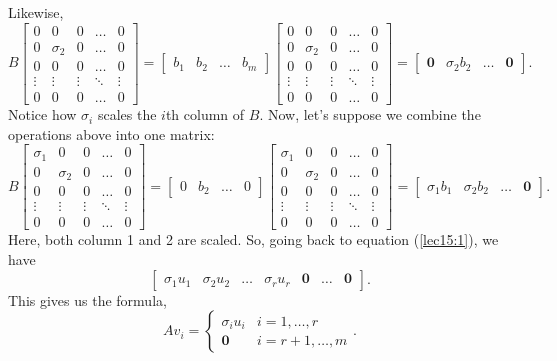 \documentclass[letterpaper]{article}
\newcommand{\0}{\mathbf{0}}
\begin{document}
Likewise, \[B \begin{bmatrix}
    0 & 0 & 0 & \hdots & 0 \\ 
    0 & \sigma_2 & 0 & \hdots & 0 \\ 
    0 & 0 & 0 & \hdots & 0 \\ 
    \vdots & \vdots & \vdots & \ddots & \vdots \\
    0 & 0 & 0 & \hdots & 0
\end{bmatrix} = \begin{bmatrix}
    b_1 & b_2 & \hdots & b_m
\end{bmatrix}\begin{bmatrix}
    0 & 0 & 0 & \hdots & 0 \\ 
    0 & \sigma_2 & 0 & \hdots & 0 \\ 
    0 & 0 & 0 & \hdots & 0 \\ 
    \vdots & \vdots & \vdots & \ddots & \vdots \\
    0 & 0 & 0 & \hdots & 0
\end{bmatrix} = \begin{bmatrix}
    \0 & \sigma_2 b_2 & \hdots & \0
\end{bmatrix}.\] 
Notice how $\sigma_i$ scales the $i$th column of $B$. Now, let's suppose we combine the operations above into one matrix: 
\[B \begin{bmatrix}
    \sigma_1 & 0 & 0 & \hdots & 0 \\ 
    0 & \sigma_2 & 0 & \hdots & 0 \\ 
    0 & 0 & 0 & \hdots & 0 \\ 
    \vdots & \vdots & \vdots & \ddots & \vdots \\
    0 & 0 & 0 & \hdots & 0
\end{bmatrix} = \begin{bmatrix}
    0 & b_2 & \hdots & 0
\end{bmatrix}\begin{bmatrix}
    \sigma_1 & 0 & 0 & \hdots & 0 \\ 
    0 & \sigma_2 & 0 & \hdots & 0 \\ 
    0 & 0 & 0 & \hdots & 0 \\ 
    \vdots & \vdots & \vdots & \ddots & \vdots \\
    0 & 0 & 0 & \hdots & 0
\end{bmatrix} = \begin{bmatrix}
    \sigma_1 b_1 & \sigma_2 b_2 & \hdots & \0
\end{bmatrix}.\] 
Here, both column 1 and 2 are scaled. So, going back to equation (\ref{lec15:1}), we have 
\[\begin{bmatrix}
    \sigma_1 u_1 & \sigma_2 u_2 & \hdots & \sigma_r u_r & \0 & \hdots & \0
\end{bmatrix}.\]
This gives us the formula,
\[Av_i = \begin{cases}
    \sigma_i u_i & i = 1, \hdots, r \\ 
    \0 & i = r + 1, \hdots, m
\end{cases}.\]
\end{document}
